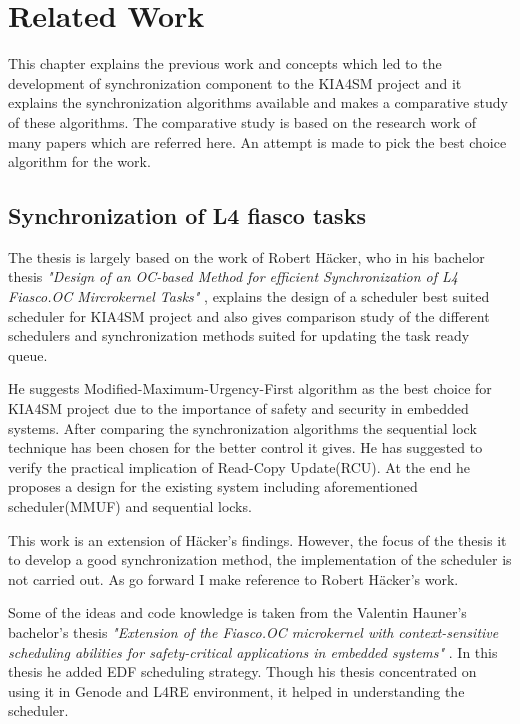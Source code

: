 \chapter{Related Work}
This chapter explains the previous work and concepts which led to the development of synchronization component to the KIA4SM project and it explains the synchronization algorithms available and makes a comparative study of these algorithms. 
The comparative study is based on the research work of many papers which are referred here. An attempt is made to pick the best choice algorithm for the work. 

\section{Synchronization of L4 fiasco tasks}

The thesis is largely based on the work of Robert H{\"a}cker, who in his bachelor thesis \textit{ "Design of an OC-based Method for efficient Synchronization of L4 Fiasco.OC Mircrokernel Tasks"} \cite{haecker}, explains the design of a scheduler best suited scheduler for KIA4SM project and also gives comparison study of the different schedulers and synchronization methods suited for updating the task ready queue. 

He suggests Modified-Maximum-Urgency-First algorithm as the best choice for KIA4SM project due to the importance of safety and security in embedded systems. After comparing the synchronization algorithms the sequential lock technique has been chosen for the better control it gives. He has suggested to verify the practical implication of Read-Copy Update(RCU). At the end he proposes a design for the existing system including aforementioned  scheduler(MMUF) and sequential locks. 

This work is an extension of H{\"a}cker's findings. However, the focus of the thesis it to develop a good synchronization method, the implementation of the scheduler is not carried out. As go forward I make reference to Robert H{\"a}cker's work. 

Some of the ideas and code knowledge is taken from the Valentin Hauner's bachelor's thesis \textit{"Extension of the Fiasco.OC microkernel with context-sensitive
scheduling abilities for safety-critical applications in embedded systems"} \cite{hauner}. In this thesis he added EDF scheduling strategy. Though his thesis concentrated on using it in Genode and L4RE environment, it helped in understanding the scheduler.

